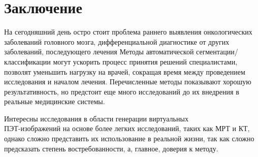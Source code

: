 \section*{Заключение} 








На сегодняшний день остро стоит проблема раннего выявления онкологических заболеваний 
головного мозга, дифференциальной диагностике от других заболеваний, последующего лечения
Методы автоматической сегментации/классификации могут ускорить процесс принятия 
решений специалистами, позволят уменьшить нагрузку на врачей, сокращая время между проведением 
исследования и началом лечения. Перечисленные методы показывают хорошую результативность, но предстоит еще 
много исследований до их внедрения в реальные медицинские системы. \par

Интересны исследования в области генерации виртуальных \\ ПЭТ-изображений на основе более 
\glqq легких \grqq исследований, таких как МРТ и КТ, однако сложно представить
их использование в реальной жизни, так как сложно предсказать степень востребованности, а, главное, доверия к методу.


